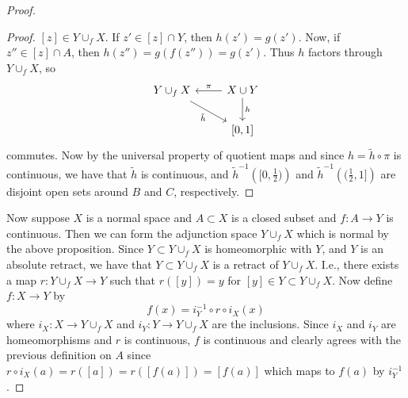 \documentclass[reqno]{amsart}
\theoremstyle{plain}%
\theoremstyle{definition}
\theoremstyle{remark}
\begin{document}
\begin{proof}
\begin{proof}
         $\left[ z \right] \in Y \cup_f X$. If $z' \in \left[ z \right] \cap
         Y$, then $h(z') = g(z')$. Now, if
         $z'' \in \left[ z \right] \cap A$, then
         $h(z'') = g\left( f(z'') \right) = g(z')$.
         Thus $h$ factors through $Y \cup_f X$, so
         \begin{equation*}
         \begin{tikzcd}
             Y \cup_f X  \ar[rd, "\tilde{h}"'] & X \cup Y \ar[d, "h"] \ar[l,
             "\pi"']\\
                               & \left[ 0,1 \right] 
         \end{tikzcd}
         \end{equation*}
         commutes. Now by the universal property of quotient maps and since
         $h = \tilde{h} \circ \pi$ is continuous, we have that
         $\tilde{h}$ is continuous, and
         $\tilde{h}^{-1}\left( [0, \frac{1}{2}) \right) $ and
         $\tilde{h}^{-1} \left( (\frac{1}{2},1] \right) $ are disjoint open sets
         around $B$ and $C$, respectively.
     \end{proof}
     Now suppose $X$ is a normal space and $A \subset X$ is a closed subset and
     $f  \colon A \to Y$ is continuous. Then we can form the
     adjunction space $Y \cup_f X$ which is normal by the above proposition.
     Since $Y \subset Y \cup_f X$ is homeomorphic with $Y$, and $Y$ is an
     absolute retract, we have that $Y \subset Y \cup_f X$ is a retract
     of $Y \cup_f X$. I.e., there exists a map $r  \colon
     Y \cup_f X \to Y$ such that $r \left( \left[ y \right]  \right) 
     = y$ for $\left[ y \right] \in Y \subset Y \cup_f X$. Now define
     $f  \colon X \to Y$ by
     \[
     f\left( x \right)  = i_Y^{-1} \circ r \circ i_X (x)
     \] 
     where $i_X  \colon X \to Y \cup_f X$ and
     $i_Y  \colon Y \to Y \cup_f X$ are the inclusions.
     Since $i_X$ and $i_Y$ are homeomorphisms and $r$ is continuous,
     $f$ is continuous and clearly agrees with the previous definition on
     $A$ since $r \circ i_X (a) = r \left( \left[ a \right]  \right) 
     = r \left( \left[ f(a) \right]  \right) 
     = \left[ f(a) \right] $ which maps to $f(a)$ by 
     $i_Y^{-1}$.
\end{proof}
     
     
    

    









%
\end{document}
